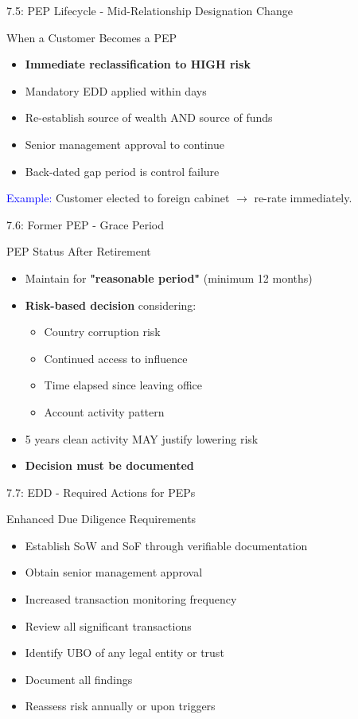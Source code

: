 \documentclass{beamer}
\begin{document}
	\begin{frame}{7.5: PEP Lifecycle - Mid-Relationship Designation Change}
		\begin{block}{When a Customer Becomes a PEP}
			\begin{itemize}
				\item \textbf{Immediate reclassification to HIGH risk}
				\item Mandatory EDD applied within days
				\item Re-establish source of wealth AND source of funds
				\item Senior management approval to continue
				\item Back-dated gap period is control failure
			\end{itemize}
		\end{block}
		\textcolor{blue}{Example:} Customer elected to foreign cabinet $\rightarrow$ re-rate immediately.
	\end{frame}
	
	\begin{frame}{7.6: Former PEP - Grace Period}
		\begin{block}{PEP Status After Retirement}
			\begin{itemize}
				\item Maintain for \textbf{"reasonable period"} (minimum 12 months)
				\item \textbf{Risk-based decision} considering:
				\begin{itemize}
					\item Country corruption risk
					\item Continued access to influence
					\item Time elapsed since leaving office
					\item Account activity pattern
				\end{itemize}
				\item 5 years clean activity MAY justify lowering risk
				\item \textbf{Decision must be documented}
			\end{itemize}
		\end{block}
	\end{frame}
	
	\begin{frame}{7.7: EDD - Required Actions for PEPs}
		\begin{block}{Enhanced Due Diligence Requirements}
			\begin{itemize}
				\item Establish SoW and SoF through verifiable documentation
				\item Obtain senior management approval
				\item Increased transaction monitoring frequency
				\item Review all significant transactions
				\item Identify UBO of any legal entity or trust
				\item Document all findings
				\item Reassess risk annually or upon triggers
			\end{itemize}
		\end{block}
	\end{frame}
	
\end{document}
